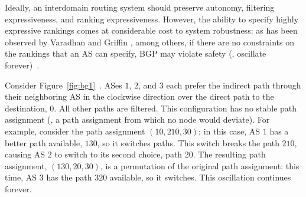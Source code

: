 

Ideally, an interdomain routing system should preserve autonomy,
filtering expressiveness, and ranking expressiveness.  However, the
ability to specify highly expressive rankings comes at considerable cost
to system robustness: as has been observed by Varadhan \ea and Griffin
\eans, among others, if there are no constraints on the rankings that an
AS can specify, BGP may violate safety (\ie, oscillate
forever)~\cite{Griffin2002c,Varadhan1996}.




\begin{example}
\label{ex:intro1}
Consider Figure~\ref{fig:bg1}~\cite{Griffin2002c,Varadhan1996}.  ASes
$1$, $2$, and $3$ each prefer the indirect path through their
neighboring AS in the clockwise direction over the direct path to the
destination, $0$.  All other paths are filtered. This configuration has
no stable path assignment (\ie, a path assignment from which no node
would deviate).
For example, consider the path assignment $(10, 210, 30)$; in this case,
AS $1$ has a better path available, $130$, so it switches paths.
This switch breaks the path $210$, causing AS $2$ to switch
to its second choice, path $20$.  The resulting path assignment,
$(130, 20, 30)$, is a permutation of the original path assignment: this
time, AS $3$ has the path $320$ available, so it switches.  This
oscillation continues forever.
\end{example}


